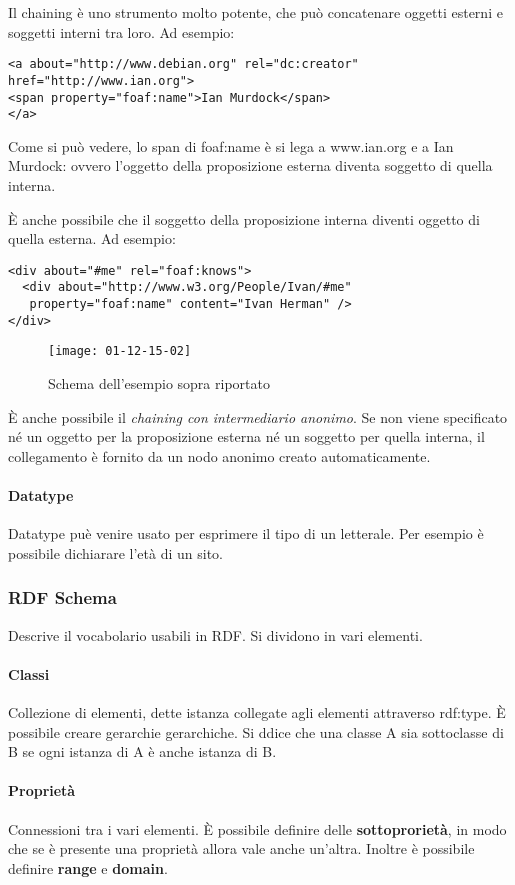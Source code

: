 Il chaining \`e uno strumento molto potente, che pu\`o concatenare oggetti esterni e soggetti interni tra loro. Ad esempio:
\begin{verbatim}
<a about="http://www.debian.org" rel="dc:creator"
href="http://www.ian.org">
<span property="foaf:name">Ian Murdock</span>
</a>
\end{verbatim}

Come si pu\`o vedere, lo span di foaf:name \`e si lega a www.ian.org e a Ian Murdock: ovvero l'oggetto della proposizione esterna diventa soggetto di quella interna.

\`E anche possibile che il soggetto della proposizione interna diventi oggetto di quella esterna. Ad esempio:
\begin{verbatim}
<div about="#me" rel="foaf:knows">
  <div about="http://www.w3.org/People/Ivan/#me"
   property="foaf:name" content="Ivan Herman" />
</div>
\end{verbatim}

\begin{figure}[h]
  \centering
  \texttt{[image: 01-12-15-02]}
  \caption{Schema dell'esempio sopra riportato}
\end{figure}

\`E anche possibile il \textit{chaining con intermediario anonimo}. Se non viene specificato n\'e un oggetto per la proposizione esterna n\'e un soggetto per quella interna, il collegamento \`e fornito da un nodo anonimo creato automaticamente.

\paragraph*{Datatype}Datatype pu\`e venire usato per esprimere il tipo di un letterale.
Per esempio \`e possibile dichiarare l'et\`a di un sito.

\subsubsection{RDF Schema}
Descrive il vocabolario usabili in RDF. Si dividono in vari elementi.

\paragraph*{Classi}Collezione di elementi, dette istanza collegate agli elementi attraverso rdf:type. \`E possibile creare gerarchie gerarchiche. Si ddice che una classe A sia sottoclasse di B se ogni istanza di A \`e anche istanza di B.

\paragraph*{Propriet\`a}Connessioni tra i vari elementi. \`E possibile definire delle \textbf{sottoproriet\`a}, in modo che se \`e presente una propriet\`a allora vale anche un'altra. Inoltre \`e possibile definire \textbf{range} e \textbf{domain}.
